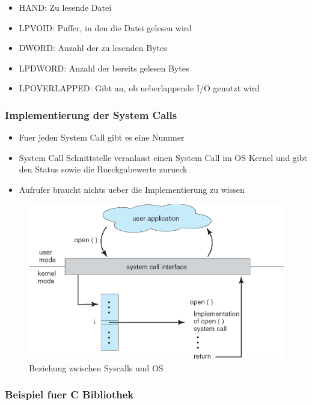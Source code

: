 \documentclass[a4paper]{scrreprt}
\begin{document}
\begin{itemize}
	\item HAND: Zu lesende Datei
	\item LPVOID: Puffer, in den die Datei gelesen wird
	\item DWORD: Anzahl der zu lesenden Bytes
	\item LPDWORD: Anzahl der bereits gelesen Bytes
	\item LPOVERLAPPED: Gibt an, ob ueberlappende I/O genutzt wird
\end{itemize}

\subsubsection{Implementierung der System Calls}
\begin{itemize}
	\item Fuer jeden System Call gibt es eine Nummer
	\item System Call Schnittstelle veranlasst einen System Call im OS Kernel und gibt den Status sowie die Rueckgabewerte zurueck
	\item Aufrufer braucht nichts ueber die Implementierung zu wissen
\end{itemize}

\begin{figure}[ht]
\centering
\includegraphics[scale=0.4]{syscall_os_relationship.png}
\caption{Beziehung zwischen Syscalls und OS}
\end{figure}

\subsubsection{Beispiel fuer C Bibliothek}
\end{document}
